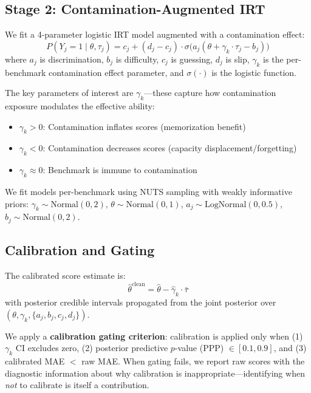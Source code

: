 \documentclass[11pt]{article}
\begin{document}
\subsection{Stage 2: Contamination-Augmented IRT}

We fit a 4-parameter logistic IRT model augmented with a contamination effect:
\begin{equation}
    P(Y_{j}=1 \mid \theta, \tau_j) = c_j + (d_j - c_j) \cdot \sigma\bigl(a_j(\theta + \gamma_k \cdot \tau_j - b_j)\bigr)
\end{equation}
where $a_j$ is discrimination, $b_j$ is difficulty, $c_j$ is guessing, $d_j$ is slip, $\gamma_k$ is the per-benchmark contamination effect parameter, and $\sigma(\cdot)$ is the logistic function.

The key parameters of interest are $\gamma_k$---these capture how contamination exposure modulates the effective ability:
\begin{itemize}
    \item $\gamma_k > 0$: Contamination inflates scores (memorization benefit)
    \item $\gamma_k < 0$: Contamination decreases scores (capacity displacement/forgetting)
    \item $\gamma_k \approx 0$: Benchmark is immune to contamination
\end{itemize}

We fit models per-benchmark using NUTS sampling \citep{hoffman2014no} with weakly informative priors: $\gamma_k \sim \text{Normal}(0, 2)$, $\theta \sim \text{Normal}(0, 1)$, $a_j \sim \text{LogNormal}(0, 0.5)$, $b_j \sim \text{Normal}(0, 2)$.

\subsection{Calibration and Gating}

The calibrated score estimate is:
\begin{equation}
    \hat{\theta}^{\text{clean}} = \hat{\theta} - \hat{\gamma}_k \cdot \bar{\tau}
\end{equation}
with posterior credible intervals propagated from the joint posterior over $(\theta, \gamma_k, \{a_j, b_j, c_j, d_j\})$.

We apply a \textbf{calibration gating criterion}: calibration is applied only when (1) $\gamma_k$ CI excludes zero, (2) posterior predictive $p$-value (PPP) $\in [0.1, 0.9]$, and (3) calibrated MAE $<$ raw MAE. When gating fails, we report raw scores with the diagnostic information about why calibration is inappropriate---identifying when \emph{not} to calibrate is itself a contribution.
\end{document}
